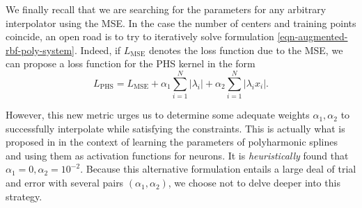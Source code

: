 \documentclass[12pt]{report} %
\newcommand{\tmop}[1]{\ensuremath{\operatorname{#1}}}
\begin{document}
We finally recall that we are searching for the parameters for any arbitrary interpolator using the MSE. In the case the number of centers and training points coincide, an open road is to try to iteratively solve formulation \eqref{eqn-augmented-rbf-poly-system}. Indeed, if $L_{\text{MSE}}$ denotes the loss function due to the MSE, we can propose a loss function for the PHS kernel in the form
\begin{equation}
  L_{\text{PHS}} = L_{\tmop{MSE}} + \alpha_1 \sum_{i = 1}^N | \lambda_i | +
  \alpha_2 \sum_{i = 1}^N | \lambda_i x_i |. \label{eqn-alternative-loss-function}
\end{equation}

However, this new metric urges us to determine some adequate weights $\alpha_1,\alpha_2$ to successfully interpolate while satisfying the constraints. This is actually what is proposed in \cite{hryniowski2018polyneuron} in the context of learning the parameters of polyharmonic splines and using them as activation functions for neurons. It is \textit{heuristically} found that $\alpha_1=0,\alpha_2=10^{-2}$. Because this alternative formulation entails a large deal of trial and error with several pairs $(\alpha_1,\alpha_2)$, we choose not to delve deeper into this strategy.
\end{document}
